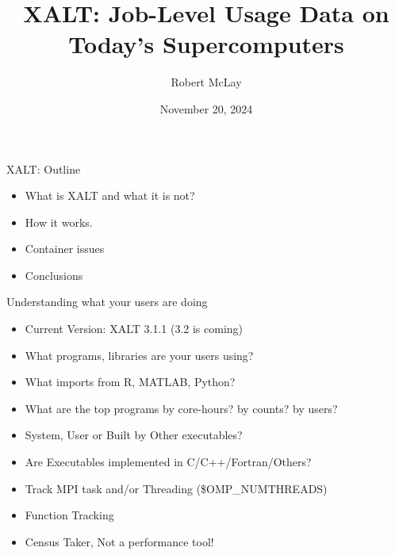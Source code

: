 \documentclass{beamer}
\begin{document}
\title[XALT]{XALT: Job-Level Usage Data on Today's Supercomputers}
\author{Robert McLay}
\date{November 20, 2024}

\frame{\titlepage}

\begin{frame}{XALT: Outline}
  \begin{itemize}
    \item What is XALT and what it is not?
    \item How it works.
    \item Container issues
    \item Conclusions
  \end{itemize}
\end{frame}

\begin{frame}{Understanding what your users are doing}
  \begin{itemize}
    \item Current Version: XALT 3.1.1 (3.2 is coming)
    \item What programs, libraries are your users using?
    \item What imports from R, MATLAB, Python?
    \item What are the top programs by core-hours? by counts? by users?
    \item System, User or Built by Other executables?
    \item Are Executables implemented in C/C++/Fortran/Others?
    \item Track MPI task and/or Threading (\$OMP\_NUMTHREADS)
    \item Function Tracking
    \item Census Taker, Not a performance tool!
  \end{itemize}
\end{frame}

\end{document}
